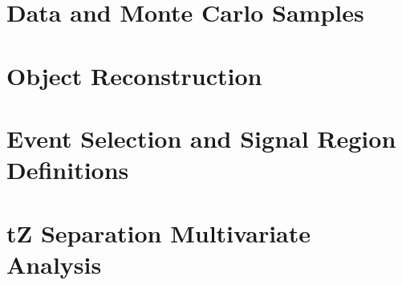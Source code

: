 \documentclass[NOTE, atlasdraft=true, texlive=2016, UKenglish]{\ATLASLATEXPATH atlasdoc}
\begin{document}
%

\section{Data and Monte Carlo Samples}
\label{sec:data}


\section{Object Reconstruction}
\label{sec:obj}


\section{Event Selection and Signal Region Definitions}
\label{sec:evt_selection}


\section{tZ Separation Multivariate Analysis}
\label{sec:tZ_bdt}


%
\end{document}
